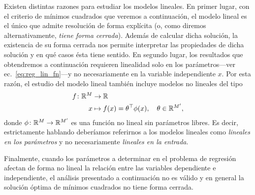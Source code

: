 \begin{mdframed}[style=discusion, frametitle={\center ¿Por qué consideramos el caso lineal en particular?}]
	Existen distintas razones para estudiar los modelos lineales. En primer lugar, con el criterio de mínimos cuadrados que veremos a continuación, el modelo lineal es el único que admite resolución de forma explícita (o, como diremos alternativamente, \emph{tiene forma cerrada}). Además de calcular dicha solución, la existencia de su forma cerrada nos permite interpretar las propiedades de dicha solución y en qué casos ésta tiene sentido. En segundo lugar, los resultados que obtendremos a continuación requieren linealidad solo en los parámetros---ver ec.~\eqref{eq:reg_lin_fn}---y no necesariamente en la variable independiente $x$. Por esta razón, el estudio del modelo lineal también incluye modelos no lineales del tipo
\begin{align}
  f \colon {\mathbb R}^M & \to {\mathbb R}\nonumber\\
  x &\mapsto f(x)=\theta^\top \phi(x), \quad \theta\in{\mathbb R}^{M'},
 \label{eq:reg_no_lin_fn} 
\end{align}
donde $\phi \colon {\mathbb R}^M \to {\mathbb R}^{M'}$ es una función no lineal sin parámetros libres. Es decir, estrictamente hablando deberíamos referirnos a los modelos lineales como \emph{lineales en los parámetros} y no necesariamente \emph{lineales en la entrada}. 

Finalmente, cuando los parámetros a determinar en el problema de regresión afectan de forma no lineal la relación entre las variables dependiente e independiente, el análisis presentado a continuación no es válido y en general la solución óptima de mínimos cuadrados no tiene forma cerrada. 
\end{mdframed}

